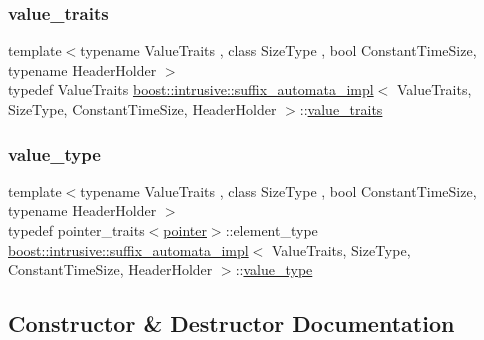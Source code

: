 \subsubsection{\texorpdfstring{value\+\_\+traits}{value\_traits}}
{\footnotesize\ttfamily template$<$typename Value\+Traits , class Size\+Type , bool Constant\+Time\+Size, typename Header\+Holder $>$ \\
typedef Value\+Traits \hyperlink{classboost_1_1intrusive_1_1suffix__automata__impl}{boost\+::intrusive\+::suffix\+\_\+automata\+\_\+impl}$<$ Value\+Traits, Size\+Type, Constant\+Time\+Size, Header\+Holder $>$\+::\hyperlink{classboost_1_1intrusive_1_1suffix__automata__impl_abbf3dee8caf18613db903931801c6076}{value\+\_\+traits}}

\mbox{\label{classboost_1_1intrusive_1_1suffix__automata__impl_afc35e3e13adbae16ac9bfb049d719cd2}} 
\subsubsection{\texorpdfstring{value\+\_\+type}{value\_type}}
{\footnotesize\ttfamily template$<$typename Value\+Traits , class Size\+Type , bool Constant\+Time\+Size, typename Header\+Holder $>$ \\
typedef pointer\+\_\+traits$<$\hyperlink{classboost_1_1intrusive_1_1suffix__automata__impl_aa30039fa797b95a84660985ab506f6ef}{pointer}$>$\+::element\+\_\+type \hyperlink{classboost_1_1intrusive_1_1suffix__automata__impl}{boost\+::intrusive\+::suffix\+\_\+automata\+\_\+impl}$<$ Value\+Traits, Size\+Type, Constant\+Time\+Size, Header\+Holder $>$\+::\hyperlink{classboost_1_1intrusive_1_1suffix__automata__impl_afc35e3e13adbae16ac9bfb049d719cd2}{value\+\_\+type}}



\subsection{Constructor \& Destructor Documentation}
\mbox{\label{classboost_1_1intrusive_1_1suffix__automata__impl_af726049e346e9b927b3ef5b4b4cf1ca4}} 
